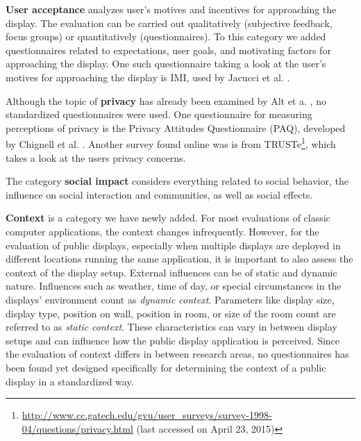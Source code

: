 	\textbf{User acceptance} analyzes user's motives and incentives for approaching the display. The evaluation can be carried out qualitatively (subjective feedback, focus groups) or quantitatively (questionnaires). To this category we added questionnaires related to expectations, user goals, and motivating factors for approaching the display. One such questionnaire taking a look at the user's motives for approaching the display is IMI, used by Jacucci et al. \cite{jacucci2010worldsofinformation}.


	Although the topic of \textbf{privacy} has already been examined by Alt et a. \cite{alt2011digifieds}, no standardized questionnaires were used. One questionnaire for measuring perceptions of privacy is the Privacy Attitudes Questionnaire (PAQ), developed by Chignell et al. \cite{chignell2003privacy}. Another survey found online was is from TRUSTe\footnote{\url{http://www.cc.gatech.edu/gvu/user_surveys/survey-1998-04/questions/privacy.html} (last accessed on April 23, 2015)}, which takes a look at the users privacy concerns.

		The category \textbf{social impact} considers everything related to social behavior, the influence on social interaction and communities, as well as social effects.

	\textbf{Context} is a category we have newly added. For most evaluations of classic computer applications, the context changes infrequently. However, for the evaluation of public displays, especially when multiple displays are deployed in different locations running the same application, it is important to also assess the context of the display setup. External influences can be of static and dynamic nature. Influences such as weather, time of day, or special circumstances in the displays' environment count as \textit{dynamic context}. Parameters like display size, display type, position on wall, position in room, or size of the room count are referred to as \textit{static context}. These characteristics can vary in between display setups and can influence how the public display application is perceived. Since the evaluation of context differs in between research areas, no questionnaires has been found yet designed specifically for determining the context of a public display in a standardized way. 

